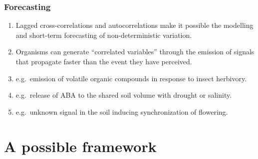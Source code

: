 \documentclass[10pt]{beamer}\usepackage[]{graphicx}\usepackage[]{color}
\begin{document}
\begin{frame}%
\frametitle{Forecasting}
\begin{enumerate}
  \item Lagged cross-correlations and autocorrelations make it possible the modelling and short-term forecasting of non-deterministic variation.
  \item Organisms can generate ``correlated variables'' through the emission of signals that propagate faster than the event they have perceived.
  \item e.g.\ emission of volatile organic compounds in response to insect herbivory.
  \item e.g.\ release of ABA to the shared soil volume with drought or salinity.
  \item e.g.\ unknown signal in the soil inducing synchronization of flowering.
\end{enumerate}
\end{frame}

\section{A possible framework}
\end{document}
